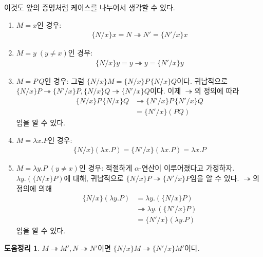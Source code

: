 \documentclass[b5paper, 11pt]{book}
\theoremstyle{definition}
\newtheorem{lem}[defn]{도움정리}
\newenvironment{pf*}{\pushQED{\qed}\pf}
{\popQED\endpf}
\begin{document}
\begin{pf*} 
    이것도 앞의 증명처럼 케이스를 나누어서 생각할 수 있다.
    \begin{enumerate}
        \item $M = x$인 경우: 
        \begin{align*}
            \{N / x\} x = N \twoheadrightarrow N' = \{N' / x\} x
        \end{align*}
        \item $M = y\; (y \neq x)$인 경우:
        \begin{align*}
            \{N / x\} y = y \twoheadrightarrow y = \{N' / x\} y
        \end{align*}
        \item $M = P \, Q$인 경우:
        그럼 $\{N /x \} M = \{N /x \} P \, \{N /x \} Q $이다. 귀납적으로 $\{N /x \} P \twoheadrightarrow \{N' /x\} P,\{N /x \} Q \twoheadrightarrow \{N' /x \} Q $이다.
        이제 $\twoheadrightarrow$의 정의에 따라 
        \begin{align*}
            \{N /x \} P \, \{N /x \} Q &\twoheadrightarrow \{N' / x \} P \, \{N' /x \} Q \\
            &= \{N' / x\} (PQ)    
        \end{align*}
        임을 알 수 있다.
        \item $M = \lambda x. P$인 경우: 
        \begin{align*}
            \{N / x\} (\lambda x. P) = \{N' / x \} (\lambda x.P) = \lambda x. P
        \end{align*}
        \item $M = \lambda y. P \; (y \neq x)$인 경우: 적절하게 $\alpha$-연산이 이루어졌다고 가정하자. $\lambda y. (\{N / x\} P)$에 대해, 귀납적으로 $\{N / x\} P \twoheadrightarrow \{N' / x \} P$임을 알 수 있다. $\twoheadrightarrow$의 정의에 의해
        \begin{align*}
            \{N / x\} (\lambda y. P)& = \lambda y. (\{N /x\} P) \\ 
            &\twoheadrightarrow \lambda y. (\{ N' / x \} P) \\
            &= \{N' / x\} (\lambda y. P)
        \end{align*}
        임을 알 수 있다.
    \end{enumerate}
\end{pf*}
\begin{lem}
    $M \twoheadrightarrow M', N \twoheadrightarrow N'$이면 $\{N / x \} M \twoheadrightarrow \{ N' / x \} M'$이다.
\end{lem}
\end{document}
